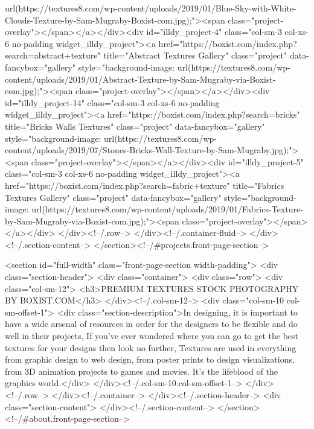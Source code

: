 url(https://textures8.com/wp-content/uploads/2019/01/Blue-Sky-with-White-Clouds-Texture-by-Sam-Mugraby-Boxist-com.jpg);"><span class="project-overlay"></span></a></div><div id="illdy_project-4" class="col-sm-3 col-xs-6 no-padding widget_illdy_project"><a href="https://boxist.com/index.php?search=abstract+texture" title="Abstract Textures Gallery" class="project" data-fancybox="gallery" style="background-image: url(https://textures8.com/wp-content/uploads/2019/01/Abstract-Texture-by-Sam-Mugraby-via-Boxist-com.jpg);"><span class="project-overlay"></span></a></div><div id="illdy_project-14" class="col-sm-3 col-xs-6 no-padding widget_illdy_project"><a href="https://boxist.com/index.php?search=bricks" title="Bricks Walls Textures" class="project" data-fancybox="gallery" style="background-image: url(https://textures8.com/wp-content/uploads/2019/07/Stones-Bricks-Wall-Texture-by-Sam-Mugraby.jpg);"><span class="project-overlay"></span></a></div><div id="illdy_project-5" class="col-sm-3 col-xs-6 no-padding widget_illdy_project"><a href="https://boxist.com/index.php?search=fabric+texture" title="Fabrics Textures Gallery" class="project" data-fancybox="gallery" style="background-image: url(https://textures8.com/wp-content/uploads/2019/01/Fabrics-Texture-by-Sam-Mugraby-via-Boxist-com.jpg);"><span class="project-overlay"></span></a></div>			</div><!--/.row-->
		</div><!--/.container-fluid-->
	</div><!--/.section-content-->
</section><!--/#projects.front-page-section-->



<section id="full-width" class="front-page-section width-padding">
			<div class="section-header">
			<div class="container">
				<div class="row">
											<div class="col-sm-12">
							<h3>PREMIUM TEXTURES STOCK PHOTOGRAPHY BY BOXIST.COM</h3>
						</div><!--/.col-sm-12-->
																<div class="col-sm-10 col-sm-offset-1">
							<div class="section-description">In designing, it is important to have a wide arsenal of resources in order for the designers to be flexible and do well in their projects, If you’ve ever wondered where you can go to get the best textures for your designs then look no further, Textures are used in everything from graphic design to web design, from poster prints to design visualizations, from 3D animation projects to games and movies. It’s the lifeblood of the graphics world.</div>
						</div><!--/.col-sm-10.col-sm-offset-1-->
									</div><!--/.row-->
			</div><!--/.container-->
		</div><!--/.section-header-->
		<div class="section-content">
			</div><!--/.section-content-->
</section><!--/#about.front-page-section-->

